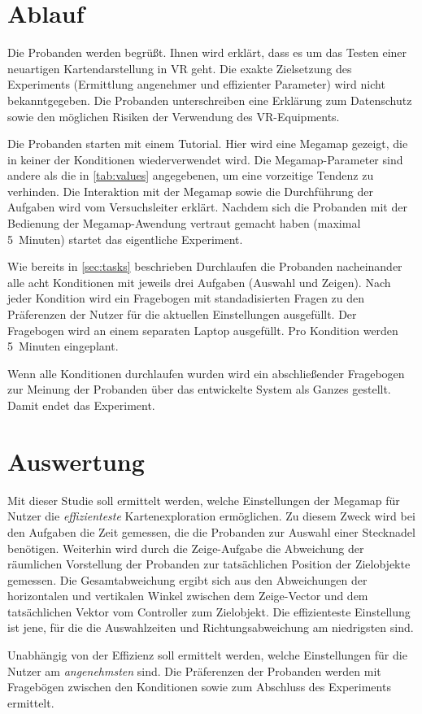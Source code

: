 \documentclass[
    draft=false,
    paper=a4,
    fontsize=12pt,
    twoside=false,
    captions=tableheading,
    british, ngerman,
]{scrartcl}
\begin{document}
\section{Ablauf}
\label{sec:execution}
Die Probanden werden begrüßt.
Ihnen wird erklärt, dass es um das Testen einer neuartigen Kartendarstellung in VR geht.
Die exakte Zielsetzung des Experiments (Ermittlung angenehmer und effizienter Parameter) wird nicht bekanntgegeben.
Die Probanden unterschreiben eine Erklärung zum Datenschutz sowie den möglichen Risiken der Verwendung des VR-Equipments.

Die Probanden starten mit einem Tutorial.
Hier wird eine Megamap gezeigt, die in keiner der Konditionen wiederverwendet wird.
Die Megamap-Parameter sind andere als die in \autoref{tab:values} angegebenen, um eine vorzeitige Tendenz zu verhinden.
Die Interaktion mit der Megamap sowie die Durchführung der Aufgaben wird vom Versuchsleiter erklärt.
Nachdem sich die Probanden mit der Bedienung der Megamap-Awendung vertraut gemacht haben (maximal 5~Minuten) startet das eigentliche Experiment.

Wie bereits in \autoref{sec:tasks} beschrieben Durchlaufen die Probanden nacheinander alle acht Konditionen mit jeweils drei Aufgaben (Auswahl und Zeigen).
Nach jeder Kondition wird ein Fragebogen mit standadisierten Fragen zu den Präferenzen der Nutzer für die aktuellen Einstellungen ausgefüllt.
Der Fragebogen wird an einem separaten Laptop ausgefüllt.
Pro Kondition werden 5~Minuten eingeplant.

Wenn alle Konditionen durchlaufen wurden wird ein abschließender Fragebogen zur Meinung der Probanden über das entwickelte System als Ganzes gestellt.
Damit endet das Experiment.

\section{Auswertung}
\label{sec:results}
Mit dieser Studie soll ermittelt werden, welche Einstellungen der Megamap für Nutzer die \emph{effizienteste} Kartenexploration ermöglichen.
Zu diesem Zweck wird bei den Aufgaben die Zeit gemessen, die die Probanden zur Auswahl einer Stecknadel benötigen.
Weiterhin wird durch die Zeige-Aufgabe die Abweichung der räumlichen Vorstellung der Probanden zur tatsächlichen Position der Zielobjekte gemessen.
Die Gesamtabweichung ergibt sich aus den Abweichungen der horizontalen und vertikalen Winkel zwischen dem Zeige-Vector und dem tatsächlichen Vektor vom Controller zum Zielobjekt.
Die effizienteste Einstellung ist jene, für die die Auswahlzeiten und Richtungsabweichung am niedrigsten sind.

Unabhängig von der Effizienz soll ermittelt werden, welche Einstellungen für die Nutzer am \emph{angenehmsten} sind.
Die Präferenzen der Probanden werden mit Fragebögen zwischen den Konditionen sowie zum Abschluss des Experiments ermittelt.
\end{document}
